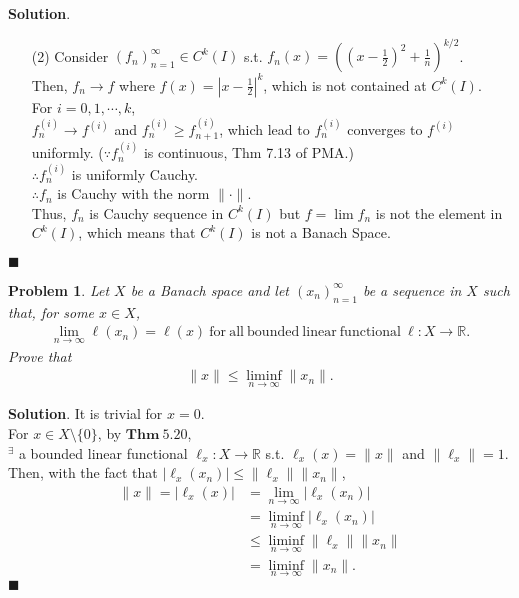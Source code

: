 \documentclass[12pt]{article}
\renewcommand{\v}[1]{\ensuremath{\mathbf{#1}}} %
\newcommand{\norm}[1]{\lVert #1 \rVert} %
\newcommand{\abs}[1]{\left| #1 \right|} %
\providecommand{\fr}{\frac}
\providecommand{\RR}{\mathbb{R}}
\providecommand{\TE}{{}^\exists}
\newtheorem{p}{Problem}%
\theoremstyle{definition}
\newenvironment{s}{%
        \begin{trivlist} \item \textbf{Solution}. }{%
            \hspace*{\fill} $\blacksquare$\end{trivlist}}%
\begin{document}
{\begin{s}
\begin{enumerate}
\item[(2)] Consider $(f_n)_{n=1}^\infty\in C^k(I)$ s.t. $f_n(x) = \left(\left(x-\fr{1}{2}\right)^2+\fr{1}{n}\right)^{k/2}$.\\
Then, $f_n\to f$ where $f(x) = \abs{x-\fr{1}{2}}^k$, which is not contained at $C^k(I)$.\\
For $i=0,1,\cdots,k$,\\
$f_n^{(i)}\to f^{(i)}$ and $f_n^{(i)} \ge f_{n+1}^{(i)}$, which lead to $f_n^{(i)}$ converges to $f^{(i)}$ uniformly. ($\because f_n^{(i)}$ is continuous, Thm 7.13 of PMA.)\\
$\therefore f_n^{(i)}$ is uniformly Cauchy.\\
$\therefore f_n$ is Cauchy with the norm $\norm{\cdot}$.\\
Thus, $f_n$ is Cauchy sequence in $C^k(I)$ but $f=\lim f_n$ is not the element in $C^k(I)$, which means that $C^k(I)$ is not a Banach Space.
\end{enumerate}
\end{s}
\bigskip

\begin{p}
Let $X$ be a Banach space and let $(x_n)_{n=1}^\infty$ be a sequence in $X$ such that, for some $x\in X$,
\begin{align*}
\lim_{n\to\infty} \mathcal{\ell}(x_n) = \ell(x)\ \mathrm{for\ all\ bounded\ linear\ functional}\ \ell:X\to\RR.
\end{align*}
Prove that
\begin{align*}
\norm{x} \le \liminf_{n\to\infty}\norm{x_n}.
\end{align*}
\end{p}
\begin{s}
It is trivial for $x=0$.\\
For  $x\in X\setminus\{0\}$, by \v{Thm\ 5.20},\\
$\TE$ a bounded linear functional $\ell_x:X\to\RR$ s.t. $\ell_x(x)=\norm{x}$ and $\norm{\ell_x}=1$.\\
Then, with the fact that $\abs{\ell_x(x_n)}\le\norm{\ell_x}\norm{x_n}$,
\begin{align*}
\norm{x} = \abs{\ell_x(x)} &= \lim_{n\to\infty}\abs{\ell_x(x_n)}\\
&= \liminf_{n\to\infty} \abs{\ell_x(x_n)}\\
&\le \liminf_{n\to\infty}\norm{\ell_x}\norm{x_n}\\
&=\liminf_{n\to\infty}\norm{x_n}.
\end{align*}
\end{s}
\end{document}
